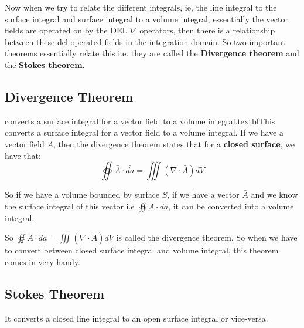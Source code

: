 Now when we try to relate the different integrals, ie, the line integral to the surface integral and surface integral to a volume integral, essentially the vector fields are operated on by the DEL $\nabla$ operators, then there is a relationship between these del operated fields in the integration domain. So two important theorems essentially relate this i.e. they are called the \textbf{Divergence theorem} and the \textbf{Stokes theorem}.

\subsection {Divergence Theorem}
\This converts a surface integral for a vector field to a volume integral.textbf{This converts a surface integral for a vector field to a volume integral.} If we have a vector field $\bar{A}$, then the divergence theorem states that for a \textbf{closed surface}, we have that:
\begin{equation}
\oiint \bar{A} \cdot \bar{da} = \iiint (\nabla \cdot \bar{A})dV
\end{equation}


So if we have a volume bounded by surface $S$, if we have a vector $\bar{A}$ and we know the surface integral of this vector i.e $\oiint \bar{A}\cdot\bar{da}$, it can be converted into a volume integral.


So $\oiint \bar{A} \cdot \bar{da} = \iiint (\nabla \cdot \bar{A})dV$ is called the divergence theorem. So when we have to convert between closed surface integral and volume integral, this theorem comes in very handy.

\subsection{Stokes Theorem}
It converts a closed line integral to an open surface integral or vice-versa.

